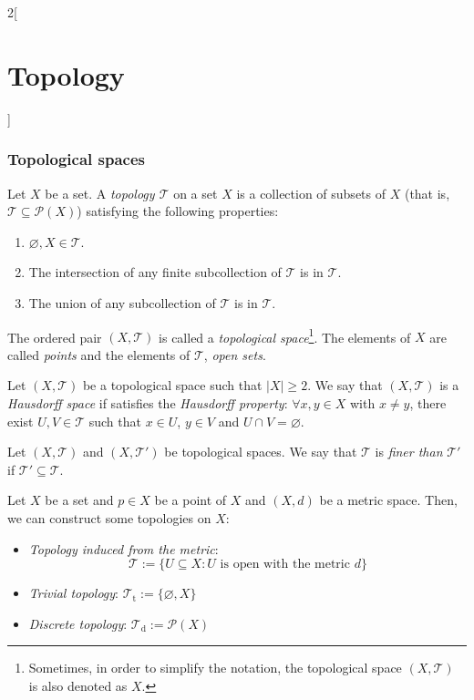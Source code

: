 \documentclass[../../../main.tex]{subfiles}
\begin{document}
\begin{multicols}{2}[\section{Topology}]
  \subsubsection{Topological spaces}
  \begin{definition}
    Let $X$ be a set. A \textit{topology $\mathcal{T}$} on a set $X$ is a collection of subsets of $X$ (that is, $\mathcal{T}\subseteq\mathcal{P}(X)$) satisfying the following properties:
    \begin{enumerate}
      \item $\varnothing, X\in\mathcal{T}$.
      \item The intersection of any finite subcollection of $\mathcal{T}$ is in $\mathcal{T}$.
      \item The union of any subcollection of $\mathcal{T}$ is in $\mathcal{T}$.
    \end{enumerate}
    The ordered pair $(X,\mathcal{T})$ is called a \textit{topological space}\footnote{Sometimes, in order to simplify the notation, the topological space $(X,\mathcal{T})$ is also denoted as $X$.}. The elements of $X$ are called \textit{points} and the elements of $\mathcal{T}$, \textit{open sets}.
  \end{definition}
  \begin{definition}
    Let $(X,\mathcal{T})$ be a topological space such that $|X|\geq 2$. We say that $(X,\mathcal{T})$ is a \textit{Hausdorff space} if satisfies the \textit{Hausdorff property}: $\forall x,y\in X$ with $x\ne y$, there exist $U,V\in\mathcal{T}$ such that $x\in U$, $y\in V$ and $U\cap V=\varnothing$.
  \end{definition}
  \begin{definition}
    Let $(X,\mathcal{T})$ and $(X,\mathcal{T}')$ be topological spaces. We say that $\mathcal{T}$ is \textit{finer than} $\mathcal{T}'$ if $\mathcal{T}'\subseteq\mathcal{T}$.
  \end{definition}
  \begin{prop}
    Let $X$ be a set and $p\in X$ be a point of $X$ and $(X,d)$ be a metric space. Then, we can construct some topologies on $X$:
    \begin{itemize}
      \item \textit{Topology induced from the metric}: $$\mathcal{T}:=\{U\subseteq X:U\text{ is open with the metric }d\}$$
      \item \textit{Trivial topology}: $\mathcal{T}_\text{t}:=\{\varnothing,X\}$
      \item \textit{Discrete topology}: $\mathcal{T}_\text{d}:=\mathcal{P}(X)$

\end{itemize}
\end{prop}
\end{multicols}
\end{document}
